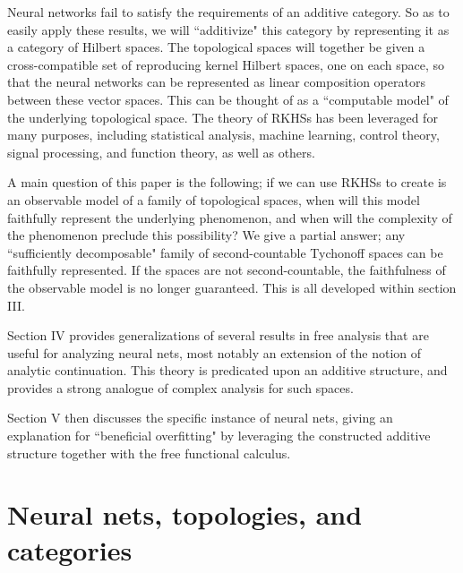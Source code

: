 \documentclass[12pt]{amsart}
\theoremstyle{definition}
\numberwithin{equation}{section}
\begin{document}
Neural networks fail to satisfy the requirements of an additive category. So as to easily apply these results, we will ``additivize" this category by representing it as a category of Hilbert spaces. The topological spaces will together be given a cross-compatible set of reproducing kernel Hilbert spaces, one on each space, so that the neural networks can be represented as linear composition operators between these vector spaces. This can be thought of as a ``computable model" of the underlying topological space. The theory of RKHSs has been leveraged for many purposes, including statistical analysis, machine learning, control theory, signal processing, and function theory, as well as others. 

A main question of this paper is the following; if we can use RKHSs to create is an observable model of a family of topological spaces, when will this model faithfully represent the underlying phenomenon, and when will the complexity of the phenomenon preclude this possibility? We give a partial answer; any ``sufficiently decomposable" family of second-countable Tychonoff spaces can be faithfully represented. If the spaces are not second-countable, the faithfulness of the observable model is no longer guaranteed. This is all developed within section III.

Section IV provides generalizations of several results in free analysis that are useful for analyzing neural nets, most notably an extension of the notion of analytic continuation. This theory is predicated upon an additive structure, and provides a strong analogue of complex analysis for such spaces. 

Section V then discusses the specific instance of neural nets, giving an explanation for ``beneficial overfitting" by leveraging the constructed additive structure together with the free functional calculus.  

\section{Neural nets, topologies, and categories}
\end{document}
